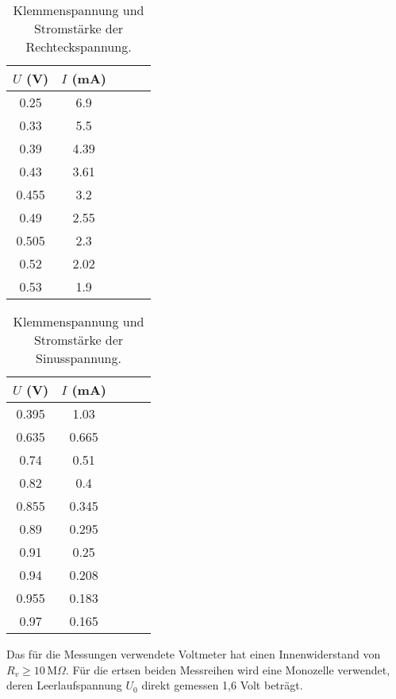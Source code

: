 \begin{table}
  \centering
  \caption{Klemmenspannung und Stromstärke der Rechteckspannung.}
  \label{tab:daten_plot3}
  \begin{tabular}{c c c c c}
    \toprule
    $U$ (V) & $I$ (mA) \\
    \midrule
     0.25 &  6.9 \\
     0.33 &  5.5 \\
     0.39 & 4.39 \\
     0.43 & 3.61 \\
    0.455 &  3.2 \\
     0.49 & 2.55 \\
    0.505 &  2.3 \\
     0.52 & 2.02 \\
     0.53 &  1.9 \\
    \bottomrule
  \end{tabular}
\end{table}

\begin{table}
  \centering
  \caption{Klemmenspannung und Stromstärke der Sinusspannung.}
  \label{tab:daten_plot4}
  \begin{tabular}{c c c c c}
    \toprule
    $U$ (V) & $I$ (mA) \\
    \midrule
    0.395 &  1.03 \\
    0.635 & 0.665 \\
     0.74 &  0.51 \\
     0.82 &   0.4 \\
    0.855 & 0.345 \\
     0.89 & 0.295 \\
     0.91 &  0.25 \\
     0.94 & 0.208 \\
    0.955 & 0.183 \\
     0.97 & 0.165 \\

    \bottomrule
  \end{tabular}
\end{table}

Das für die Messungen verwendete Voltmeter hat einen Innenwiderstand von $R_v \geq 10 \, \text{M}\Omega $.
Für die ertsen beiden Messreihen wird eine Monozelle verwendet, deren Leerlaufspannung $U_0$ direkt gemessen 1,6 Volt beträgt.

